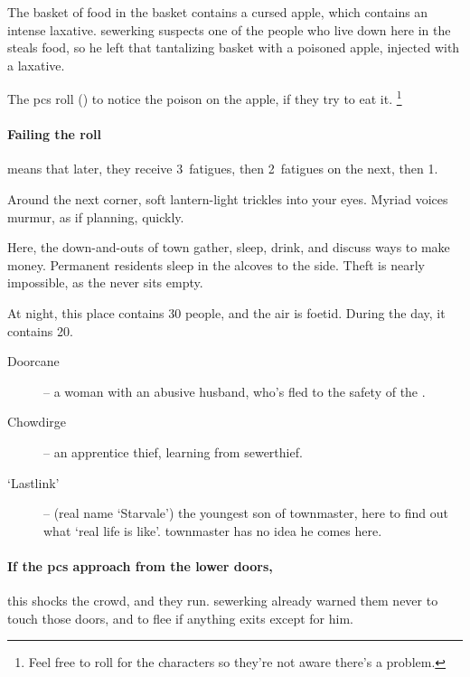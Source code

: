 
\begin{exampletext}
  The basket of food in the basket contains a cursed apple, which contains an intense laxative.
  \Gls{sewerking} suspects one of the people who live down here in the  steals food, so he left that tantalizing basket with a poisoned apple, injected with a laxative.
\end{exampletext}

The \glspl{pc} roll  (\tn[11]) to notice the poison on the apple, if they try to eat it.%
\footnote{Feel free to roll for the characters so they're not aware there's a problem.}

\paragraph{Failing the roll}
means that  later, they receive 3~\glspl{fatigue}, then 2~\glspl{fatigue} on the next, then 1.

\begin{boxtext}
  Around the next corner, soft lantern-light trickles into your eyes.
  Myriad voices murmur, as if planning, quickly.
\end{boxtext}


Here, the down-and-outs of \gls{town} gather, sleep, drink, and discuss ways to make money.
Permanent residents sleep in the alcoves to the side.
Theft is nearly impossible, as the  never sits empty.

At night, this place contains 30 people, and the air is foetid.
During the day, it contains 20.

\begin{description}
  \item[Doorcane] -- a woman with an abusive husband, who's fled to the safety of the .
  \item[Chowdirge] -- an apprentice thief, learning from \gls{sewerthief}.
  \item[`Lastlink'] -- (real name `Starvale') the youngest son of \gls{townmaster}, here to find out what `real life is like'.
  \Gls{townmaster} has no idea he comes here.
\end{description}

\paragraph{If the \glspl{pc} approach from the lower doors,}
this shocks the crowd, and they run.
\Gls{sewerking} already warned them never to touch those doors, and to flee if anything exits except for him.

